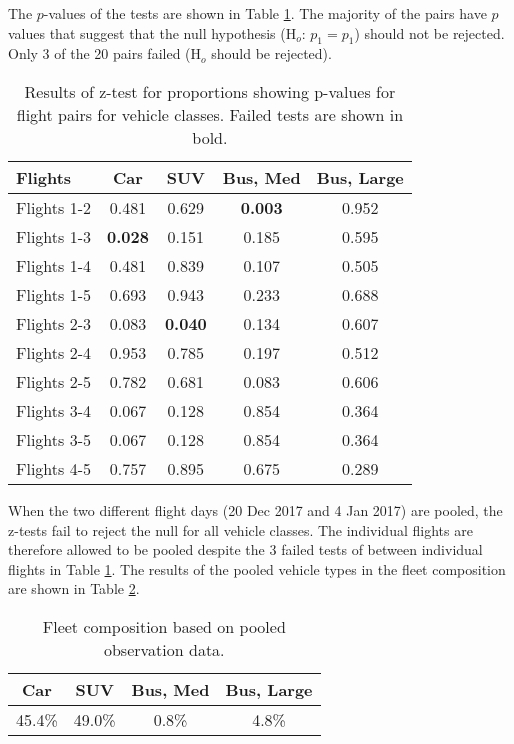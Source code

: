 \documentclass[preprint,12pt,a4paper]{elsarticle}
\begin{document}
\begin{linenumbers}
The $p$-values of the tests are shown in Table \ref{tab:ztestprop}. The majority of the pairs have $p$ values that suggest that the null hypothesis (H$_{o}$: $p_{1} = p_{1}$) should not be rejected. Only 3 of the 20 pairs failed (H$_{o}$ should be rejected).


\begin{table}[H]
\centering
\caption{Results of z-test for proportions showing p-values for flight pairs for vehicle classes. Failed tests are shown in bold.}
\label{tab:ztestprop}
\begin{tabular}{@{}lcccc@{}}
\toprule
\textbf{Flights} & \textbf{Car} & \textbf{SUV} & \textbf{Bus, Med} & \textbf{Bus, Large} \\ \midrule
Flights 1-2 & 0.481 & 0.629 & \textbf{0.003} & 0.952 \\
Flights 1-3 & \textbf{0.028} & 0.151 & 0.185 & 0.595 \\
Flights 1-4 & 0.481 & 0.839 & 0.107 & 0.505 \\
Flights 1-5 & 0.693 & 0.943 & 0.233 & 0.688 \\
Flights 2-3 & 0.083 & \textbf{0.040} & 0.134 & 0.607 \\
Flights 2-4 & 0.953 & 0.785 & 0.197 & 0.512 \\
Flights 2-5 & 0.782 & 0.681 & 0.083 & 0.606 \\
Flights 3-4 & 0.067 & 0.128 & 0.854 & 0.364 \\
Flights 3-5 & 0.067 & 0.128 & 0.854 & 0.364 \\
Flights 4-5 & 0.757 & 0.895 & 0.675 & 0.289 \\ \bottomrule
\end{tabular}
\end{table}

When the two different flight days (20 Dec 2017 and 4 Jan 2017) are pooled, the z-tests fail to reject the null for all vehicle classes.  The individual flights are therefore allowed to be pooled despite the 3 failed tests of between individual flights in Table \ref{tab:ztestprop}. The results of the pooled vehicle types in the fleet composition are shown in Table \ref{tab:pooledfleet}.

\begin{table}[H]
\centering
\caption{Fleet composition based on pooled observation data.}
\label{tab:pooledfleet}
\begin{tabular}{cccc}
\toprule
\textbf{Car} & \textbf{SUV} & \textbf{Bus, Med} & \textbf{Bus, Large} \\ \midrule
45.4\% & 49.0\% & 0.8\% & 4.8\%\\ \bottomrule
\end{tabular}
\end{table}


\end{linenumbers}
\end{document}
